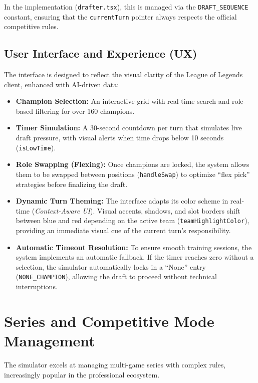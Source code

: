 \documentclass[12pt, a4paper]{article}
\begin{document}
    In the implementation (\texttt{drafter.tsx}), this is managed via the \texttt{DRAFT\_SEQUENCE} constant, ensuring that the \texttt{currentTurn} pointer always respects the official competitive rules.

    \subsection{User Interface and Experience (UX)}
    The interface is designed to reflect the visual clarity of the League of Legends client, enhanced with AI-driven data:
    \begin{itemize}
        \item \textbf{Champion Selection:} An interactive grid with real-time search and role-based filtering for over 160 champions.
        \item \textbf{Timer Simulation:} A 30-second countdown per turn that simulates live draft pressure, with visual alerts when time drops below 10 seconds (\texttt{isLowTime}).
        \item \textbf{Role Swapping (Flexing):} Once champions are locked, the system allows them to be swapped between positions (\texttt{handleSwap}) to optimize ``flex pick'' strategies before finalizing the draft.
        \item \textbf{Dynamic Turn Theming:} The interface adapts its color scheme in real-time (\textit{Context-Aware UI}). Visual accents, shadows, and slot borders shift between blue and red depending on the active team (\texttt{teamHighlightColor}), providing an immediate visual cue of the current turn’s responsibility.
        \item \textbf{Automatic Timeout Resolution:} To ensure smooth training sessions, the system implements an automatic fallback. If the timer reaches zero without a selection, the simulator automatically locks in a ``None'' entry (\texttt{NONE\_CHAMPION}), allowing the draft to proceed without technical interruptions.
    \end{itemize}


    \section{Series and Competitive Mode Management}

    The simulator excels at managing multi-game series with complex rules, increasingly popular in the professional ecosystem.
\end{document}
